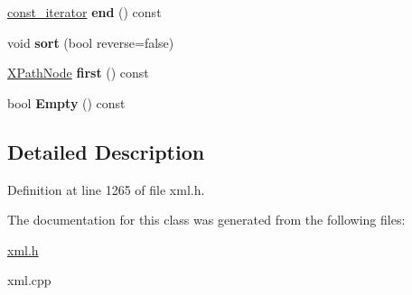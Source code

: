 \begin{DoxyCompactItemize}
\item 
\hypertarget{classphys_1_1xml_1_1XPathNodeSet_adc1ab904e2122928837cc02f1b0a54bf}{
\hyperlink{classphys_1_1xml_1_1XPathNode}{const\_\-iterator} {\bfseries end} () const }
\label{de/dc2/classphys_1_1xml_1_1XPathNodeSet_adc1ab904e2122928837cc02f1b0a54bf}

\item 
\hypertarget{classphys_1_1xml_1_1XPathNodeSet_ad18d6b92f885ee9d862f5008af734559}{
void {\bfseries sort} (bool reverse=false)}
\label{de/dc2/classphys_1_1xml_1_1XPathNodeSet_ad18d6b92f885ee9d862f5008af734559}

\item 
\hypertarget{classphys_1_1xml_1_1XPathNodeSet_a7d3c2d75f154b863a8e81d32e4662b78}{
\hyperlink{classphys_1_1xml_1_1XPathNode}{XPathNode} {\bfseries first} () const }
\label{de/dc2/classphys_1_1xml_1_1XPathNodeSet_a7d3c2d75f154b863a8e81d32e4662b78}

\item 
\hypertarget{classphys_1_1xml_1_1XPathNodeSet_a77e87e2a776cf28501d284532f60e74a}{
bool {\bfseries Empty} () const }
\label{de/dc2/classphys_1_1xml_1_1XPathNodeSet_a77e87e2a776cf28501d284532f60e74a}

\end{DoxyCompactItemize}


\subsection{Detailed Description}


Definition at line 1265 of file xml.h.



The documentation for this class was generated from the following files:\begin{DoxyCompactItemize}
\item 
\hyperlink{xml_8h}{xml.h}\item 
xml.cpp\end{DoxyCompactItemize}
